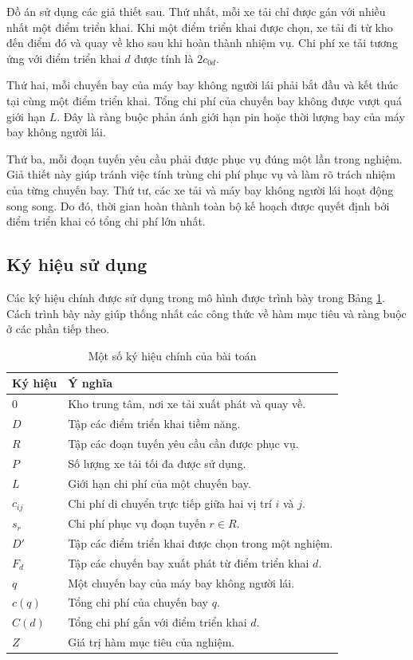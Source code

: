 Đồ án sử dụng các giả thiết sau. Thứ nhất, mỗi xe tải chỉ được gán với nhiều nhất một điểm triển khai. Khi một điểm triển khai được chọn, xe tải đi từ kho đến điểm đó và quay về kho sau khi hoàn thành nhiệm vụ. Chi phí xe tải tương ứng với điểm triển khai $d$ được tính là $2c_{0d}$.

Thứ hai, mỗi chuyến bay của máy bay không người lái phải bắt đầu và kết thúc tại cùng một điểm triển khai. Tổng chi phí của chuyến bay không được vượt quá giới hạn $L$. Đây là ràng buộc phản ánh giới hạn pin hoặc thời lượng bay của máy bay không người lái.

Thứ ba, mỗi đoạn tuyến yêu cầu phải được phục vụ đúng một lần trong nghiệm. Giả thiết này giúp tránh việc tính trùng chi phí phục vụ và làm rõ trách nhiệm của từng chuyến bay. Thứ tư, các xe tải và máy bay không người lái hoạt động song song. Do đó, thời gian hoàn thành toàn bộ kế hoạch được quyết định bởi điểm triển khai có tổng chi phí lớn nhất.

\subsection{Ký hiệu sử dụng}

Các ký hiệu chính được sử dụng trong mô hình được trình bày trong Bảng \ref{tab:chapter3-notation}. Cách trình bày này giúp thống nhất các công thức về hàm mục tiêu và ràng buộc ở các phần tiếp theo.

\begin{table}[H]
\centering
\caption{Một số ký hiệu chính của bài toán}
\label{tab:chapter3-notation}

\renewcommand{\arraystretch}{1.25}
\begin{tabular}{@{}>{\raggedright\arraybackslash}p{3.0cm}
                >{\raggedright\arraybackslash}p{10.5cm}@{}}
\toprule
\textbf{Ký hiệu} & \textbf{Ý nghĩa} \\
\midrule
$0$ & Kho trung tâm, nơi xe tải xuất phát và quay về. \\
$D$ & Tập các điểm triển khai tiềm năng. \\
$R$ & Tập các đoạn tuyến yêu cầu cần được phục vụ. \\
$P$ & Số lượng xe tải tối đa được sử dụng. \\
$L$ & Giới hạn chi phí của một chuyến bay. \\
$c_{ij}$ & Chi phí di chuyển trực tiếp giữa hai vị trí $i$ và $j$. \\
$s_r$ & Chi phí phục vụ đoạn tuyến $r \in R$. \\
$D'$ & Tập các điểm triển khai được chọn trong một nghiệm. \\
$F_d$ & Tập các chuyến bay xuất phát từ điểm triển khai $d$. \\
$q$ & Một chuyến bay của máy bay không người lái. \\
$c(q)$ & Tổng chi phí của chuyến bay $q$. \\
$C(d)$ & Tổng chi phí gắn với điểm triển khai $d$. \\
$Z$ & Giá trị hàm mục tiêu của nghiệm. \\
\bottomrule
\end{tabular}
\end{table}

